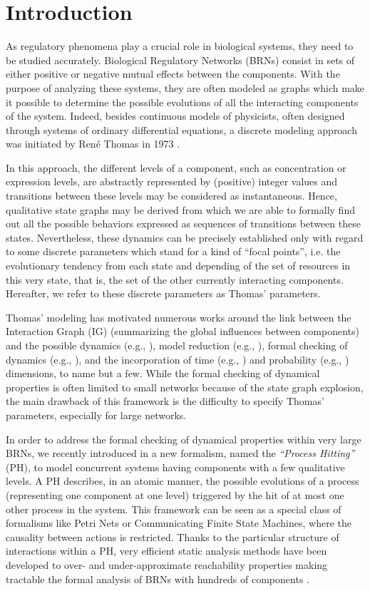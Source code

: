 \section{Introduction}
As regulatory phenomena play a crucial role in biological systems, they need to be studied accurately.
Biological Regulatory Networks (BRNs) consist in sets of either positive or negative mutual effects between the components.
With the purpose of analyzing these systems, they are often modeled as graphs which make it possible to determine the possible evolutions of all the interacting components of the system.
Indeed, besides continuous models of physicists, often designed through systems of ordinary
differential equations, a discrete modeling approach was initiated by René Thomas in 1973
\cite{Thomas73}.

In this approach, the different levels of a component, such as concentration or expression levels, are abstractly represented by (positive) integer values and transitions between these levels may be considered as instantaneous.
Hence, qualitative state graphs may be derived from which we are able to formally find out all the possible behaviors expressed as sequences of transitions between these states.
Nevertheless, these dynamics can be precisely established only with regard to some discrete parameters which stand for a kind of ``focal points'', i.e. the evolutionary tendency from each state and depending of the set of resources in this very state, that is, the set of the other currently interacting components.
Hereafter, we refer to these discrete parameters as Thomas' parameters.

Thomas' modeling has motivated numerous works around the link between the Interaction Graph (IG)
(summarizing the global influences between components) and the possible dynamics (e.g.,
\cite{RiCo07,RRT08}),
model reduction (e.g., \cite{Naldi09}), formal checking of dynamics (e.g., \cite{Richard06,Naldi07}), 
and the incorporation of time (e.g., \cite{Siebert06,Ahmad08}) and probability
(e.g., \cite{Twardziok10-CMSB}) dimensions, to name but a few.
While the formal checking of dynamical properties is often limited to small networks because of the
state graph explosion, the main drawback of this framework is the difficulty to specify Thomas'
parameters, especially for large networks.

In order to address the formal checking of dynamical properties within very large BRNs, we recently
introduced in \cite{PMR10-TCSB} a new formalism, named the \emph{``Process Hitting''} (PH), to model
concurrent systems having components with a few qualitative levels.
A PH describes, in an atomic manner, the possible evolutions of a process (representing one
component at one level) triggered by the hit of at most one other process in the system.
This framework can be seen as a special class of formalisms like Petri Nets or Communicating Finite
State Machines, where the causality between actions is restricted.
Thanks to the particular structure of interactions within a PH, very efficient static analysis
methods have been developed to over- and under-approximate reachability properties making tractable
the formal analysis of BRNs with hundreds of components \cite{PMR12-MSCS}.

